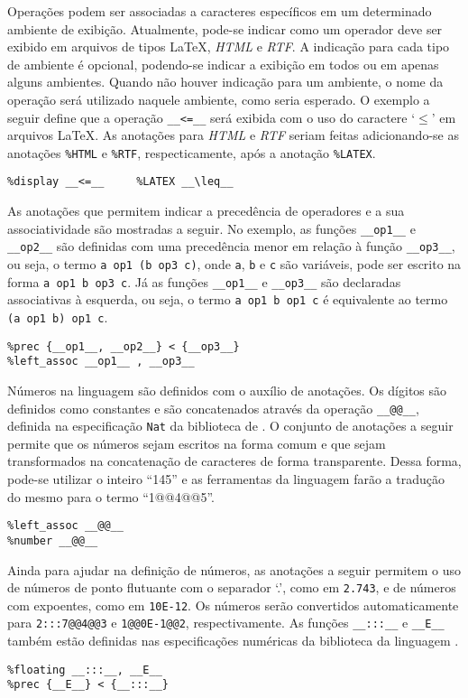 Operações podem ser associadas a caracteres específicos em um determinado ambiente de exibição.
Atualmente, pode-se indicar como um operador deve ser exibido em arquivos de tipos \LaTeX, \textit{HTML} e \textit{RTF}.
A indicação para cada tipo de ambiente é opcional, podendo-se indicar a exibição em todos ou em apenas alguns ambientes.
Quando não houver indicação para um ambiente, o nome da operação será utilizado naquele ambiente, como seria esperado.
O exemplo a seguir define que a operação \Verb.__<=__. será exibida com o uso do caractere `$\leq$' em arquivos \LaTeX.
As anotações para \textit{HTML} e \textit{RTF} seriam feitas adicionando-se as anotações \Verb.%
\begin{Verbatim}
%display __<=__     %LATEX __\leq__
\end{Verbatim}

As anotações que permitem indicar a precedência de operadores e a sua associatividade são mostradas a seguir.
No exemplo, as funções \Verb.__op1__. e \Verb.__op2__. são definidas com uma precedência menor em relação à função \Verb.__op3__., ou seja, o termo \Verb.a op1 (b op3 c)., onde \Verb.a., \Verb.b. e \Verb.c. são variáveis, pode ser escrito na forma \Verb.a op1 b op3 c..
Já as funções \Verb.__op1__. e \Verb.__op3__. são declaradas associativas à esquerda, ou seja, o termo \Verb.a op1 b op1 c. é equivalente ao termo \Verb.(a op1 b) op1 c..
\begin{Verbatim}
%prec {__op1__, __op2__} < {__op3__}
%left_assoc __op1__ , __op3__
\end{Verbatim}

Números na linguagem \CASL são definidos com o auxílio de anotações.
Os dígitos são definidos como constantes e são concatenados através da operação \Verb.__@@__., definida na especificação \Verb.Nat. da biblioteca de \CASL.
O conjunto de anotações a seguir permite que os números sejam escritos na forma comum e que sejam transformados na concatenação de caracteres de forma transparente.
Dessa forma, pode-se utilizar o inteiro ``145'' e as ferramentas da linguagem farão a tradução do mesmo para o termo ``1@@4@@5''.
\begin{Verbatim}
%left_assoc __@@__
%number __@@__
\end{Verbatim}

Ainda para ajudar na definição de números, as anotações a seguir permitem o uso de números de ponto flutuante com o separador `.', como em \Verb_2.743_, e de números com expoentes, como em \Verb.10E-12..
Os números serão convertidos automaticamente para \Verb.2:::7@@4@@3. e \Verb.1@@0E-1@@2., respectivamente.
As funções \Verb.__:::__. e \Verb.__E__. também estão definidas nas especificações numéricas da biblioteca da linguagem \CASL.
\begin{Verbatim}
%floating __:::__, __E__
%prec {__E__} < {__:::__}
\end{Verbatim}

